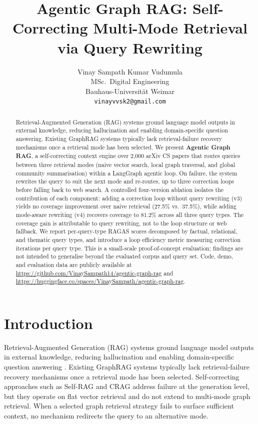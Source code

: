 \documentclass[11pt]{article}
\title{Agentic Graph RAG: Self-Correcting Multi-Mode Retrieval via Query Rewriting}
\author{
  Vinay Sampath Kumar Vudumula \\
  MSc.\ Digital Engineering \\
  Bauhaus-Universit\"{a}t Weimar \\
  \texttt{vinayvvsk2@gmail.com}
}
\begin{document}
\maketitle

\begin{abstract}
Retrieval-Augmented Generation (RAG) systems ground language model outputs
in external knowledge, reducing hallucination and enabling domain-specific
question answering. Existing GraphRAG systems typically lack
retrieval-failure recovery mechanisms once a retrieval mode has been
selected. We present \textbf{Agentic Graph RAG}, a self-correcting context
engine over 2,000 arXiv CS papers that routes queries between three
retrieval modes (naive vector search, local graph traversal, and global
community summarisation) within a LangGraph agentic loop. On failure, the
system rewrites the query to suit the next mode and re-routes, up to three
correction loops before falling back to web search. A controlled
four-version ablation isolates the contribution of each component: adding a
correction loop without query rewriting (v3) yields no coverage improvement
over naive retrieval (27.5\% vs.\ 37.5\%), while adding mode-aware
rewriting (v4) recovers coverage to 81.2\% across all three query types.
The coverage gain is attributable to query rewriting, not to the loop
structure or web fallback. We report per-query-type RAGAS scores decomposed
by factual, relational, and thematic query types, and introduce a loop
efficiency metric measuring correction iterations per query type. This is a
small-scale proof-of-concept evaluation; findings are not intended to
generalise beyond the evaluated corpus and query set. Code, demo, and
evaluation data are publicly available at
\url{https://github.com/VinaySampath14/agentic-graph-rag} and
\url{https://huggingface.co/spaces/VinaySampath/agentic-graph-rag}.
\end{abstract}

\section{Introduction}
\label{sec:intro}

Retrieval-Augmented Generation (RAG) systems ground language model outputs
in external knowledge, reducing hallucination and enabling domain-specific
question answering \cite{lewis2020retrieval}. Existing GraphRAG systems
typically lack retrieval-failure recovery mechanisms once a retrieval mode
has been selected. Self-correcting approaches such as Self-RAG
\cite{asai2023self} and CRAG \cite{yan2024corrective} address failure at
the generation level, but they operate on flat vector retrieval and do not
extend to multi-mode graph retrieval. When a selected graph retrieval
strategy fails to surface sufficient context, no mechanism redirects the
query to an alternative mode.
\end{document}
